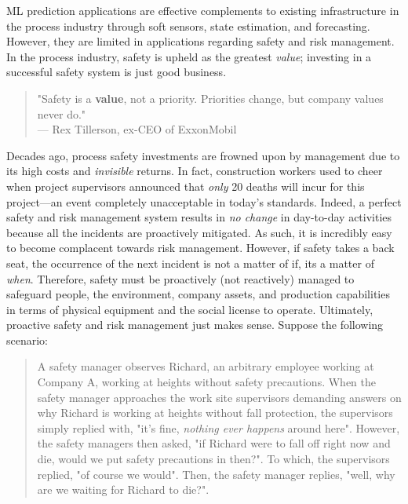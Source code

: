 %
% 

ML prediction applications are effective complements to existing infrastructure in the process industry through soft sensors, state estimation, and forecasting. However, they are limited in applications regarding safety and risk management.  In the process industry, safety is upheld as the greatest \textit{value}; investing in a successful safety system is just good business.  

\begin{quote}
    "Safety is a \textbf{value}, not a priority.  Priorities change, but company values never do." \\
    --- Rex Tillerson, ex-CEO of ExxonMobil
\end{quote}

Decades ago, process safety investments are frowned upon by management due to its high costs and \textit{invisible} returns. In fact, construction workers used to cheer when project supervisors announced that \textit{only} 20 deaths will incur for this project---an event completely unacceptable in today's standards. Indeed, a perfect safety and risk management system results in \textit{no change} in day-to-day activities because all the incidents are proactively mitigated. As such, it is incredibly easy to become complacent towards risk management. However, if safety takes a back seat, the occurrence of the next incident is not a matter of if, its a matter of \textit{when}. Therefore, safety must be proactively (not reactively) managed to safeguard people, the environment, company assets, and production capabilities in terms of physical equipment and the social license to operate. Ultimately, proactive safety and risk management just makes sense.  Suppose the following scenario:

\begin{quote}
A safety manager observes Richard, an arbitrary employee working at Company A, working at heights without safety precautions.  When the safety manager approaches the work site supervisors demanding answers on why Richard is working at heights without fall protection, the supervisors simply replied with, "it's fine, \textit{nothing ever happens} around here". However, the safety managers then asked, "if Richard were to fall off right now and die, would we put safety precautions in then?".  To which, the supervisors replied, "of course we would".  Then, the safety manager replies, "well, why are we waiting for Richard to die?".
\end{quote}

